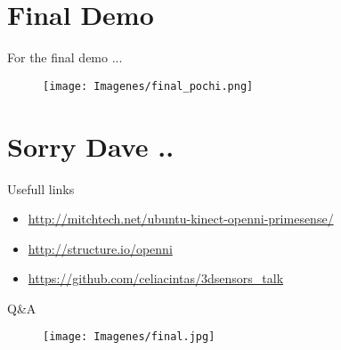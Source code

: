 \documentclass[bigger]{beamer}
\begin{document}

\section{Final Demo}
\begin{frame}{ For the final demo ...}
\begin{figure}[h]
        \texttt{[image: Imagenes/final\_pochi.png]}
\end{figure}
\end{frame}


\section{Sorry Dave ..}

\begin{frame}{ Usefull links}
\begin{itemize}
	\item \url{http://mitchtech.net/ubuntu-kinect-openni-primesense/}
	\item \url{http://structure.io/openni}
	\item \url{https://github.com/celiacintas/3dsensors_talk}
\end{itemize}
\end{frame}

\begin{frame}{ Q\&A}
\begin{figure}[h]
		\texttt{[image: Imagenes/final.jpg]}
\end{figure}
\end{frame}
\end{document}
